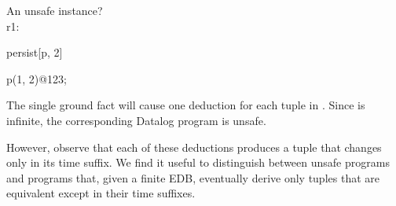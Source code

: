 

\begin{example}
\label{ex:tempsafe}
%
An unsafe \slang instance?
\\
r1:
\begin{Dedalus}
persist[p, 2]

p(1, 2)@123;
\end{Dedalus}


The single ground fact will cause one deduction for each tuple in
.  Since  is infinite, the corresponding
Datalog program is unsafe.  
%
\end{example}

However, observe that each of these deductions produces a tuple that changes
only in its time suffix.  We find it useful to distinguish between unsafe
programs and programs that, given a finite EDB, eventually derive only tuples
that are equivalent except in their time suffixes.




